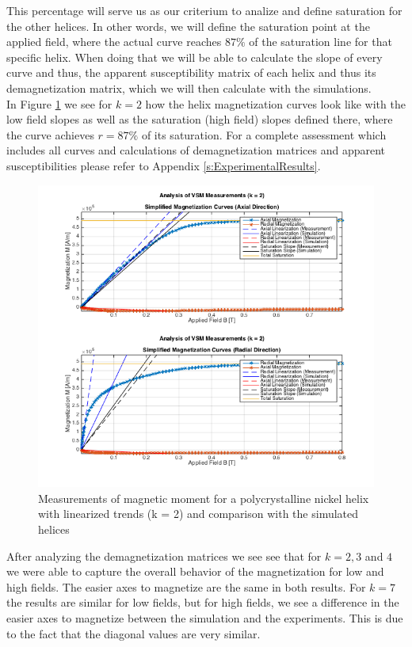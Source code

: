 This percentage will serve us as our criterium to analize and define saturation for the other helices. In other words, we will define the saturation point at the applied field, where the actual curve reaches $87\%$ of the saturation line for that specific helix. When doing that we will be able to calculate the slope of every curve and thus, the apparent susceptibility matrix of each helix and thus its demagnetization matrix, which we will then calculate with the simulations. \\


In Figure \ref{fig:NiHelix_Slopes} we see for $k = 2$ how the helix magnetization curves look like with the low field slopes as well as the saturation (high field) slopes defined there, where the curve achieves $r = 87\%$ of its saturation. For a complete assessment which includes all curves and calculations of demagnetization matrices and apparent susceptibilities please refer to Appendix \ref{s:ExperimentalResults}.\\

\begin{figure}[ht]
	\centering
  \includegraphics[width=1\textwidth]{Pictures/NiHelix_Slopes.png}
	\caption{Measurements of magnetic moment for a polycrystalline nickel helix with linearized trends (k = 2) and comparison with the simulated helices}
	\label{fig:NiHelix_Slopes}
\end{figure}

After analyzing the demagnetization matrices we see see that for $k=2, 3$ and $4$ we were able to capture the overall behavior of the magnetization for low and high fields. The easier axes to magnetize are the same in both results. For $k = 7$ the results are similar for low fields, but for high fields, we see a difference in the easier axes to magnetize between the simulation and the experiments. This is due to the fact that the diagonal values are very similar. \\

